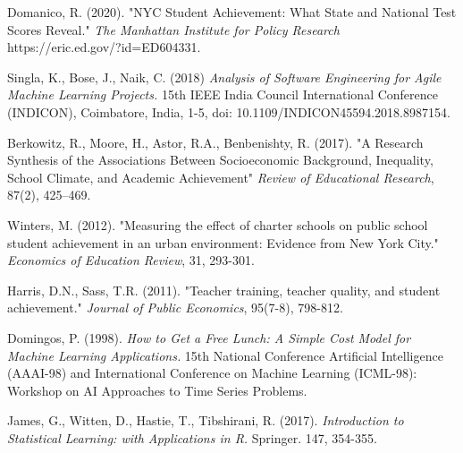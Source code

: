 \documentclass[sigconf,nonacm,11pt]{acmart}
\begin{document}
\begin{thebibliography}{9}
Domanico, R. (2020). "NYC Student Achievement: What State and National Test Scores Reveal."  \textit{The Manhattan Institute for Policy Research} https://eric.ed.gov/?id=ED604331. 

Singla, K., Bose, J., Naik, C. (2018) \textit{Analysis of Software Engineering for Agile Machine Learning Projects.} 15th IEEE India Council International Conference (INDICON), Coimbatore, India, 1-5, doi: 10.1109/INDICON45594.2018.8987154.

Berkowitz, R., Moore, H., Astor, R.A., Benbenishty, R. (2017). "A Research Synthesis of the Associations Between Socioeconomic Background, Inequality, School Climate, and Academic Achievement" \textit{Review of Educational Research}, 87(2), 425–469.

Winters, M. (2012). "Measuring the effect of charter schools on public school student achievement in an urban environment: Evidence from New York City." \textit{Economics of Education Review}, 31, 293-301.

Harris, D.N., Sass, T.R. (2011). "Teacher training, teacher quality, and student achievement." \textit{Journal of Public Economics}, 95(7-8), 798-812.

Domingos, P. (1998). \textit{How to Get a Free Lunch: A Simple Cost Model for Machine Learning Applications.} 15th National Conference Artificial Intelligence (AAAI-98) and International Conference on Machine Learning (ICML-98): Workshop on AI Approaches to Time Series Problems.

James, G., Witten, D., Hastie, T., Tibshirani, R. (2017). \textit{Introduction to Statistical Learning: with Applications in R.} Springer. 147, 354-355.


\end{thebibliography}




\appendix
\end{document}
